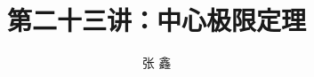 









\title[概率论]{第二十三讲：中心极限定理}
\author[张鑫{\rm Email: x.zhang.seu@foxmail.com} ]{\large 张 鑫}
\date{}

{ 
	\begin{frame}
		\titlepage
	\end{frame}
}

